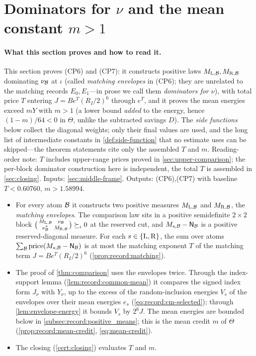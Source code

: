 \section{Dominators for \texorpdfstring{$\nu$}{nu} and the mean constant \texorpdfstring{$m>1$}{m>1}}\label{sec:matching-mean}

\paragraph{What this section proves and how to read it.}
This section proves (CP6) and (CP7): it constructs positive laws
$M_{{\rm L},\mathcal B},M_{{\rm R},\mathcal B}$ dominating $\nu_\mathcal B$ at $\iota$
(called \emph{matching envelopes} in (CP6); they are unrelated to
the matching records $E_0,E_1$---in prose we call them
\emph{dominators for $\nu$}), with total price $T$ entering
$J=Be^T(R_I/2)^6$ through $e^T$, and it proves the mean energies
exceed $mY$ with $m>1$ (a lower bound \emph{added} to the energy,
hence $(1-m)/64<0$ in $\Theta$, unlike the subtracted savings $D$).
The \emph{side functions} below collect the diagonal weights; only
their final values are used, and the long list of intermediate
constants in \cref{def:side-function} that no estimate uses can be
skipped---the theorem statements cite only the assembled $T$ and
$m$. Reading-order note: $T$ includes upper-range prices proved in
\cref{sec:upper-comparison}; the per-block dominator construction
here is independent, the total $T$ is assembled in
\cref{sec:closing}. Inputs: \cref{sec:middle-frame}. Outputs:
(CP6),(CP7) with baseline $T<0.60760$, $m>1.58994$.
\begin{itemize}
\item For every atom $\mathcal B$ it constructs two positive measures
 $M_{{\rm L},\mathcal B}$ and $M_{{\rm R},\mathcal B}$, the \emph{matching envelopes}. The
 comparison law sits in a positive semidefinite $2\times2$ block
 $\bigl(\begin{smallmatrix}M_{{\rm L},\mathcal B}&\nu_\mathcal B\\
 \nu_\mathcal B^*&M_{{\rm R},\mathcal B}\end{smallmatrix}\bigr)\succeq_\iota0$ at the reserved
 cut, and $M_{s,\mathcal B}-\mathsf N_\mathcal B$ is a positive reserved-diagonal measure. For each $s\in\{{\rm L},{\rm R}\}$, the sum over atoms $\sum_\mathcal B\operatorname{price}(M_{s,\mathcal B}-\mathsf N_\mathcal B)$ is at most the matching exponent $T$ of the matching term
 $J=Be^T(R_I/2)^6$ (\cref{prop:record:matching}).
\item The proof of \cref{thm:comparison} uses the envelopes twice. Through the
 index-support lemma (\cref{lem:record:common-mean}) it compares the signed
 index form $J_\nu$ with $Y_\nu$, up to the excess of the random-inclusion
 energies $V_s$ of the envelopes over their mean energies $e_s$
 (\cref{eq:record:cm-selected}); through \cref{lem:envelope-energy} it bounds
 $V_s$ by $2^6J$. The mean energies are bounded below in
 \cref{subsec:record:positive_means}; this is the mean credit $m$ of $\Theta$
 (\cref{prop:record:mean-credit}, \eqref{eq:mean-credit}).
\item The closing (\cref{cert:closing}) evaluates $T$ and $m$.
\end{itemize}

